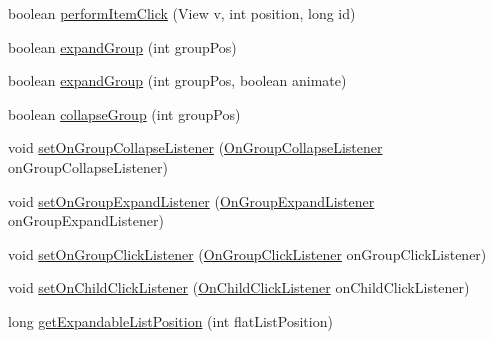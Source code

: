 \begin{DoxyCompactItemize}
boolean \hyperlink{classit_1_1sephiroth_1_1android_1_1library_1_1widget_1_1_expandable_h_list_view_aaca63c3e7be498a42c3341f32a0ea5a2}{perform\+Item\+Click} (View v, int position, long id)
\item 
boolean \hyperlink{classit_1_1sephiroth_1_1android_1_1library_1_1widget_1_1_expandable_h_list_view_a17245dd7b9992c22a1daa30a716887c1}{expand\+Group} (int group\+Pos)
\item 
boolean \hyperlink{classit_1_1sephiroth_1_1android_1_1library_1_1widget_1_1_expandable_h_list_view_a22d2e38f6785fa7a0857cc571e908b84}{expand\+Group} (int group\+Pos, boolean animate)
\item 
boolean \hyperlink{classit_1_1sephiroth_1_1android_1_1library_1_1widget_1_1_expandable_h_list_view_ac5bebe66496bfbafeaa7901fe17f5dd4}{collapse\+Group} (int group\+Pos)
\item 
void \hyperlink{classit_1_1sephiroth_1_1android_1_1library_1_1widget_1_1_expandable_h_list_view_ac5f4f05f37f7608b642d4b7627a8a2c5}{set\+On\+Group\+Collapse\+Listener} (\hyperlink{interfaceit_1_1sephiroth_1_1android_1_1library_1_1widget_1_1_expandable_h_list_view_1_1_on_group_collapse_listener}{On\+Group\+Collapse\+Listener} on\+Group\+Collapse\+Listener)
\item 
void \hyperlink{classit_1_1sephiroth_1_1android_1_1library_1_1widget_1_1_expandable_h_list_view_a3cec1a8d9b0cf283fa989f1c0ae9bf22}{set\+On\+Group\+Expand\+Listener} (\hyperlink{interfaceit_1_1sephiroth_1_1android_1_1library_1_1widget_1_1_expandable_h_list_view_1_1_on_group_expand_listener}{On\+Group\+Expand\+Listener} on\+Group\+Expand\+Listener)
\item 
void \hyperlink{classit_1_1sephiroth_1_1android_1_1library_1_1widget_1_1_expandable_h_list_view_a4203037fe65d67b74863280083116893}{set\+On\+Group\+Click\+Listener} (\hyperlink{interfaceit_1_1sephiroth_1_1android_1_1library_1_1widget_1_1_expandable_h_list_view_1_1_on_group_click_listener}{On\+Group\+Click\+Listener} on\+Group\+Click\+Listener)
\item 
void \hyperlink{classit_1_1sephiroth_1_1android_1_1library_1_1widget_1_1_expandable_h_list_view_ab4c0bee6412839dc740597a961c4af60}{set\+On\+Child\+Click\+Listener} (\hyperlink{interfaceit_1_1sephiroth_1_1android_1_1library_1_1widget_1_1_expandable_h_list_view_1_1_on_child_click_listener}{On\+Child\+Click\+Listener} on\+Child\+Click\+Listener)
\item 
long \hyperlink{classit_1_1sephiroth_1_1android_1_1library_1_1widget_1_1_expandable_h_list_view_a158096893cbb6d7d49b10a4719b422ca}{get\+Expandable\+List\+Position} (int flat\+List\+Position)

\end{DoxyCompactItemize}
